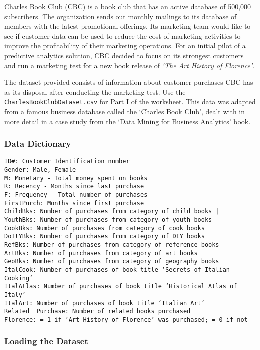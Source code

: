 \documentclass[
]{article}
\begin{document}
Charles Book Club (CBC) is a book club that has an active database of
500,000 subscribers. The organization sends out monthly mailings to its
database of members with the latest promotional offerings. Its marketing
team would like to see if customer data can be used to reduce the cost
of marketing activities to improve the profitability of their marketing
operations. For an initial pilot of a predictive analytics solution, CBC
decided to focus on its strongest customers and run a marketing test for
a new book release of \emph{`The Art History of Florence'}.

The dataset provided consists of information about customer purchases
CBC has as its disposal after conducting the marketing test. Use the
\texttt{CharlesBookClubDataset.csv} for Part I of the worksheet. This
data was adapted from a famous business database called the `Charles
Book Club', dealt with in more detail in a case study from the `Data
Mining for Business Analytics' book.

\hypertarget{data-dictionary}{%
\subsubsection{Data Dictionary}\label{data-dictionary}}

\begin{verbatim}
ID#: Customer Identification number 
Gender: Male, Female
M: Monetary - Total money spent on books
R: Recency - Months since last purchase
F: Frequency - Total number of purchases
FirstPurch: Months since first purchase
ChildBks: Number of purchases from category of child books |
YouthBks: Number of purchases from category of youth books
CookBks: Number of purchases from category of cook books
DoItYBks: Number of purchases from category of DIY books
RefBks: Number of purchases from category of reference books
ArtBks: Number of purchases from category of art books
GeoBks: Number of purchases from category of geography books
ItalCook: Number of purchases of book title ‘Secrets of Italian Cooking’
ItalAtlas: Number of purchases of book title ‘Historical Atlas of Italy’
ItalArt: Number of purchases of book title ‘Italian Art’   
Related  Purchase: Number of related books purchased
Florence: = 1 if ‘Art History of Florence’ was purchased; = 0 if not 
\end{verbatim}

\hypertarget{loading-the-dataset}{%
\subsubsection{Loading the Dataset}\label{loading-the-dataset}}
\end{document}

